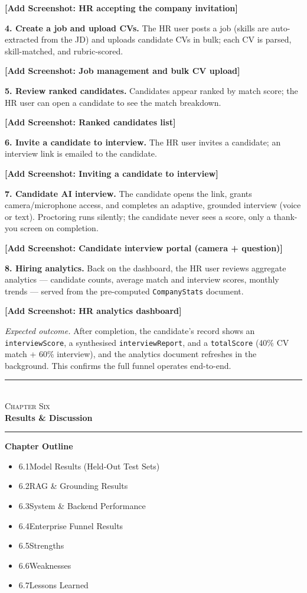 \documentclass[12pt,a4paper,oneside]{report}
\newcommand{\chapterfrontpage}[3]{%
  \clearpage
  \thispagestyle{empty}
  \vspace*{4cm}
  \begin{center}
    \textcolor{ainshams}{\rule{0.6\linewidth}{1.5pt}}\\[0.6cm]
    {\LARGE\textsc{#1}}\\[0.8cm]
    {\Huge\bfseries #2}\\[0.6cm]
    \textcolor{ainshams}{\rule{0.6\linewidth}{1.5pt}}
  \end{center}
  \vspace{1.8cm}
  \begin{center}
    \begin{minipage}{0.72\linewidth}
      \textbf{\large Chapter Outline}\\[6pt]
      \begin{itemize}[leftmargin=1.4em]
        #3
      \end{itemize}
    \end{minipage}
  \end{center}
  \clearpage
}
\begin{document}
\textbf{[Add Screenshot: HR accepting the company invitation]}

\textbf{4. Create a job and upload CVs.} The HR user posts a job (skills are auto-extracted
from the JD) and uploads candidate CVs in bulk; each CV is parsed, skill-matched, and
rubric-scored.

\textbf{[Add Screenshot: Job management and bulk CV upload]}

\textbf{5. Review ranked candidates.} Candidates appear ranked by match score; the HR user can
open a candidate to see the match breakdown.

\textbf{[Add Screenshot: Ranked candidates list]}

\textbf{6. Invite a candidate to interview.} The HR user invites a candidate; an interview
link is emailed to the candidate.

\textbf{[Add Screenshot: Inviting a candidate to interview]}

\textbf{7. Candidate AI interview.} The candidate opens the link, grants camera/microphone
access, and completes an adaptive, grounded interview (voice or text). Proctoring runs
silently; the candidate never sees a score, only a thank-you screen on completion.

\textbf{[Add Screenshot: Candidate interview portal (camera + question)]}

\textbf{8. Hiring analytics.} Back on the dashboard, the HR user reviews aggregate analytics
--- candidate counts, average match and interview scores, monthly trends --- served from the
pre-computed \texttt{CompanyStats} document.

\textbf{[Add Screenshot: HR analytics dashboard]}

\textit{Expected outcome.} After completion, the candidate's record shows an
\texttt{interviewScore}, a synthesised \texttt{interviewReport}, and a \texttt{totalScore}
(40\% CV match + 60\% interview), and the analytics document refreshes in the background.
This confirms the full funnel operates end-to-end.

\chapterfrontpage{Chapter Six}{Results \& Discussion}{%
  \item 6.1\quad Model Results (Held-Out Test Sets)
  \item 6.2\quad RAG \& Grounding Results
  \item 6.3\quad System \& Backend Performance
  \item 6.4\quad Enterprise Funnel Results
  \item 6.5\quad Strengths
  \item 6.6\quad Weaknesses
  \item 6.7\quad Lessons Learned
}
\end{document}
